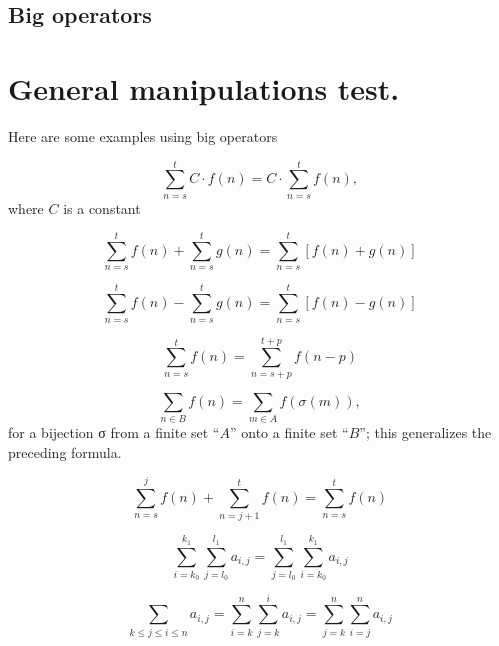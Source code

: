  \subsection{Big operators}
 \begin{multicols}{2}
 \showop{}
 \showop{}
 \showop{}
 \showop{}
 \showop{}
 \showop{}
 \showop{}
 \showop{}
 \showop{}
 \showop{}
 \showop{}
 \showop{}
 \showop{}
 \showop{}
 \showop{}
 \showop{}
 \showop{}
 \showop{}
 \showop{}
 \showop{}
 \showop{}
 \showop{}
 \showop{}
 \showop{}
 \showop{}
 \showop{}
 \showop{}
 \showop{}
 \showop{}
 \showop{}
 \showop{}
 \showop{}
 \showop{}
 \end{multicols}
 
 \section{General manipulations test.}
 
 Here are some examples using big operators

$$\sum_{n=s}^t C\cdot f(n) = C\cdot \sum_{n=s}^t f(n),$$ where $C$ is a constant

\[\sum_{n=s}^t f(n) + \sum_{n=s}^{t} g(n) = \sum_{n=s}^t \left[f(n) + g(n)\right]\] 

\[\sum_{n=s}^t f(n) - \sum_{n=s}^{t} g(n) = \sum_{n=s}^t \left[f(n) - g(n)\right]\] 

\[\sum_{n=s}^t f(n) = \sum_{n=s+p}^{t+p} f(n-p) \] 

\[\sum_{n\in B} f(n) = \sum_{m\in A} f(\sigma(m)),\] for a bijection σ from a finite set ``$A$'' onto a finite set ``$B$''; this generalizes the preceding formula.

\[\sum_{n=s}^j f(n) + \sum_{n=j+1}^t f(n) = \sum_{n=s}^t f(n)\] 

\[\sum_{i=k_0}^{k_1}\sum_{j=l_0}^{l_1} a_{i,j} = \sum_{j=l_0}^{l_1}\sum_{i=k_0}^{k_1} a_{i,j}\] 

\[\sum_{k\le j \le i\le n} a_{i,j} = \sum_{i=k}^n\sum_{j=k}^i a_{i,j} = \sum_{j=k}^n\sum_{i=j}^n a_{i,j}\] 


